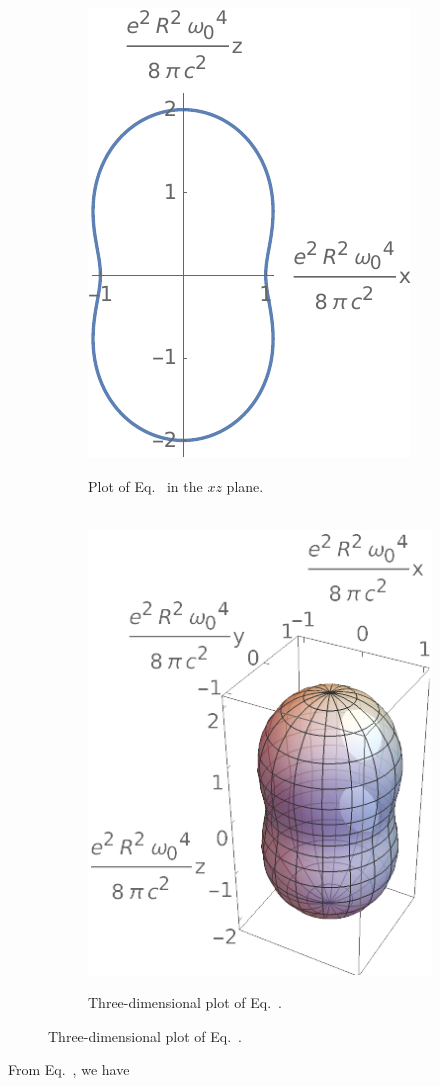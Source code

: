 {	\begin{figure}[b!]
	\vspace{-6pt}
		\begin{minipage}{0.45\textwidth}
			\begin{figure}[H] \flushright
				\includegraphics{3b} $\ $
				\caption{Plot of Eq.~ in the $xz$ plane.}
				\label{3b}
			\end{figure}
		\end{minipage}%
		\hspace{0.05\linewidth}%
		\begin{minipage}{0.475\textwidth}
			\begin{figure}[H] \flushleft
				$\quad$ \includegraphics{3b3d}
				\caption{Three-dimensional plot of Eq.~.}
				\label{3b3d}
			\end{figure}
		\end{minipage}
	\end{figure}
	
	From Eq.~, we have
	\vfix
}